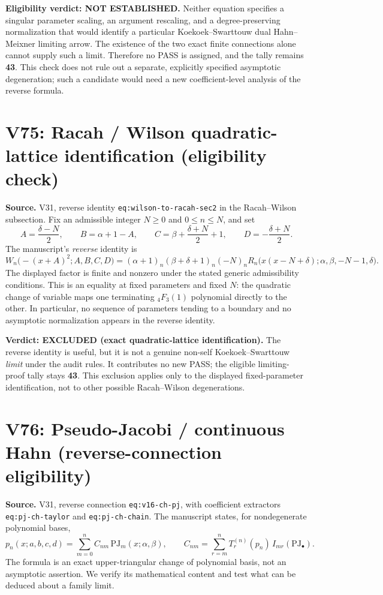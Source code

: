 \documentclass[11pt]{article}
\begin{document}
\noindent\textbf{Eligibility verdict: NOT ESTABLISHED.}
Neither equation specifies a singular parameter scaling, an argument
rescaling, and a degree-preserving normalization that would identify a
particular Koekoek--Swarttouw dual Hahn--Meixner limiting arrow.
The existence of the two exact finite connections alone cannot supply
such a limit.  Therefore no PASS is assigned, and the tally remains
\textbf{43}.  This check does not rule out a separate, explicitly
specified asymptotic degeneration; such a candidate would need a new
coefficient-level analysis of the reverse formula.


\section{V75: Racah / Wilson quadratic-lattice identification (eligibility check)}
\noindent\textbf{Source.} V31, reverse identity
\texttt{eq:wilson-to-racah-sec2} in the Racah--Wilson subsection.
Fix an admissible integer $N\geq0$ and $0\leq n\leq N$, and set
\[
 A=\frac{\delta-N}{2},\qquad B=\alpha+1-A,\qquad
 C=\beta+\frac{\delta+N}{2}+1,\qquad D=-\frac{\delta+N}{2}.
\]
The manuscript's \emph{reverse} identity is
\[
 W_n\bigl(-(x+A)^2;A,B,C,D\bigr)
 = (\alpha+1)_n(\beta+\delta+1)_n(-N)_n
 R_n\bigl(x(x-N+\delta);\alpha,\beta,-N-1,\delta\bigr).
\]
The displayed factor is finite and nonzero under the stated generic
admissibility conditions.  This is an equality at fixed parameters and
fixed $N$: the quadratic change of variable maps one terminating
${}_4F_3(1)$ polynomial directly to the other.  In particular, no
sequence of parameters tending to a boundary and no asymptotic
normalization appears in the reverse identity.

\noindent\textbf{Verdict: EXCLUDED (exact quadratic-lattice identification).}
The reverse identity is useful, but it is not a genuine non-self
Koekoek--Swarttouw \emph{limit} under the audit rules.  It contributes
no new PASS; the eligible limiting-proof tally stays \textbf{43}.
This exclusion applies only to the displayed fixed-parameter
identification, not to other possible Racah--Wilson degenerations.


\section{V76: Pseudo-Jacobi / continuous Hahn (reverse-connection eligibility)}
\noindent\textbf{Source.} V31, reverse connection
\texttt{eq:v16-ch-pj}, with coefficient extractors
\texttt{eq:pj-ch-taylor} and \texttt{eq:pj-ch-chain}.
The manuscript states, for nondegenerate polynomial bases,
\[
 p_n(x;a,b,c,d)=\sum_{m=0}^n C_{nm}\,
 \mathrm{PJ}_m(x;\alpha,\beta),\qquad
 C_{nm}=\sum_{r=m}^n T_r^{(n)}(p_n)\,
 I_{mr}(\mathrm{PJ}_\bullet).
\]
The formula is an exact upper-triangular change of polynomial basis,
not an asymptotic assertion.  We verify its mathematical content
and test what can be deduced about a family limit.
\end{document}
